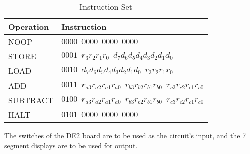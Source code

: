 \documentclass[12pt]{article}
\begin{document}
\begin{table}[htbp]
    \centering
    \begin{tabular}{ll}                                                                                                                 \\\toprule
        \textbf{Operation}  & \textbf{Instruction}                                                                                      \\\midrule
        NOOP                & $0000 \;\: 0000 \;\: 0000 \;\: 0000$                                                                      \\
        STORE               & $0001 \;\: r_3 r_2 r_1 r_0 \;\: d_7 d_6 d_5 d_4 d_3 d_2 d_1 d_0$                                          \\
        LOAD                & $0010 \;\: d_7 d_6 d_5 d_4 d_3 d_2 d_1 d_0 \;\: r_3 r_2 r_1 r_0$                                          \\
        ADD                 & $0011 \;\: r_{a3} r_{a2} r_{a1} r_{a0} \;\: r_{b3} r_{b2} r_{b1} r_{b0} \;\: r_{c3} r_{c2} r_{c1} r_{c0}$ \\
        SUBTRACT            & $0100 \;\: r_{a3} r_{a2} r_{a1} r_{a0} \;\: r_{b3} r_{b2} r_{b1} r_{b0} \;\: r_{c3} r_{c2} r_{c1} r_{c0}$ \\
        HALT                & $0101 \;\: 0000 \;\: 0000 \;\: 0000$                                                                      \\\bottomrule
    \end{tabular}
    \caption{Instruction Set}
    \label{tab:instructions}
\end{table}

The switches of the DE2 board are to be used as the circuit’s input, and the 7 segment displays are to be used for output.

\FloatBarrier 
\FloatBarrier \clearpage
\FloatBarrier 
\FloatBarrier \clearpage
\FloatBarrier 
\FloatBarrier \clearpage
\FloatBarrier 
\FloatBarrier \clearpage
\FloatBarrier 
\FloatBarrier \clearpage
\FloatBarrier 
\FloatBarrier \clearpage
\FloatBarrier 
\end{document}
